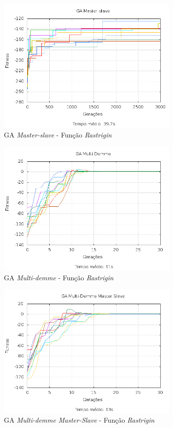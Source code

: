 \documentclass[12pt]{article}
\begin{document}
\begin{figure}[hp]
  \centering
  \includegraphics[width=0.8\textwidth]{ms_f3.png}
  \caption{GA \emph{Master-slave} - Função \emph{Rastrigin}}
\end{figure}

\begin{figure}[hp]
  \centering
  \includegraphics[width=0.8\textwidth]{md_f3.png}
  \caption{GA \emph{Multi-demme} - Função \emph{Rastrigin}}
\end{figure}

\begin{figure}[ht!p]
  \centering
  \includegraphics[width=0.8\textwidth]{mdms_f3.png}
  \caption{GA \emph{Multi-demme Master-Slave} - Função \emph{Rastrigin}}
\end{figure}
\end{document}
